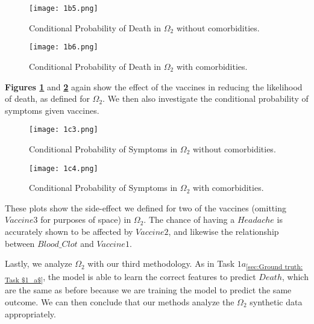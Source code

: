 
\begin{figure}[H]
  \texttt{[image: 1b5.png]}
  \caption{Conditional Probability of Death in $\Omega_2$ without comorbidities.}
  \label{fig:1b5}
\end{figure}

\begin{figure}[H]
  \texttt{[image: 1b6.png]}
  \caption{Conditional Probability of Death in $\Omega_2$ with comorbidities.}
  \label{fig:1b6}
\end{figure}

\textbf{Figures \ref{fig:1b5}} and \textbf{\ref{fig:1b6}} again show the effect of the vaccines in reducing the likelihood of death, as defined for $\Omega_2$. We then also investigate the conditional probability of symptoms given vaccines.

\graphicspath{{pictures/task1c/}}

\begin{figure}[H]
  \texttt{[image: 1c3.png]}
  \caption{Conditional Probability of Symptoms in $\Omega_2$ without comorbidities.}
  \label{fig:1c3}
\end{figure}

\begin{figure}[H]
  \texttt{[image: 1c4.png]}
  \caption{Conditional Probability of Symptoms in $\Omega_2$ with comorbidities.}
  \label{fig:1c4}
\end{figure}

These plots show the side-effect we defined for two of the vaccines (omitting $Vaccine3$ for purposes of space) in $\Omega_2$. The chance of having a $Headache$ is accurately shown to be affected by $Vaccine2$, and likewise the relationship between $Blood\_Clot$ and $Vaccine1$.


Lastly, we analyze $\Omega_2$ with our third methodology. As in Task $1a$\textsubscript{\ref{sec:Ground truth: Task $1_a$}}, the model is able to learn the correct features to predict $Death$, which are the same as before because we are training the model to predict the same outcome. We can then conclude that our methods analyze the $\Omega_2$ synthetic data appropriately.

